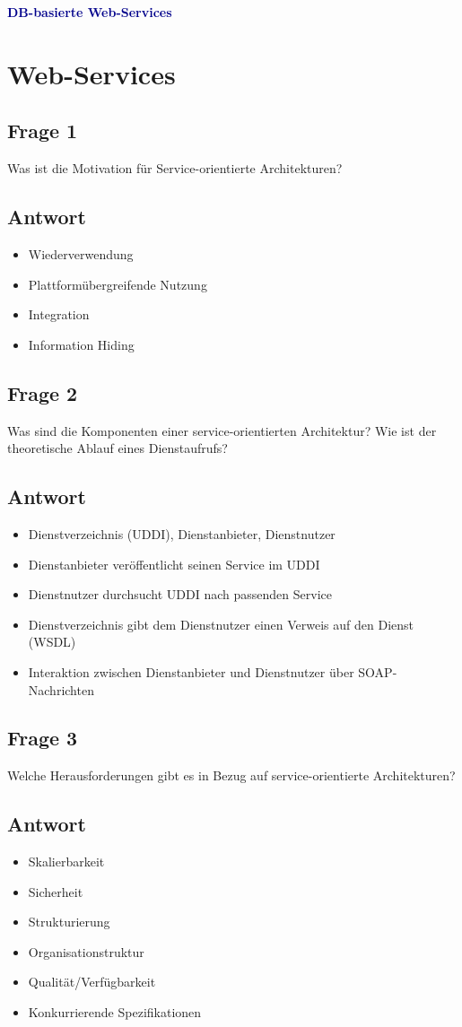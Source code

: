 \textbf{\textcolor{darkblue}{ DB-basierte Web-Services}}~

\section*{Web-Services}
\subsection*{Frage 1}
Was ist die Motivation für Service-orientierte Architekturen?
\subsection*{Antwort}
\begin{itemize}
	\item Wiederverwendung
	\item Plattformübergreifende Nutzung
    \item Integration
    \item Information Hiding
\end{itemize}

\subsection*{Frage 2}
Was sind die Komponenten einer service-orientierten Architektur? Wie ist der theoretische Ablauf eines Dienstaufrufs?
\subsection*{Antwort}
\begin{itemize}
	\item Dienstverzeichnis (UDDI), Dienstanbieter, Dienstnutzer
	\item Dienstanbieter veröffentlicht seinen Service im UDDI
	\item Dienstnutzer durchsucht UDDI nach passenden Service
	\item Dienstverzeichnis gibt dem Dienstnutzer einen Verweis auf den Dienst (WSDL)
	\item Interaktion zwischen Dienstanbieter und Dienstnutzer über SOAP-Nachrichten
\end{itemize}
\subsection*{Frage 3}
Welche Herausforderungen gibt es in Bezug auf service-orientierte Architekturen?
\subsection*{Antwort}
\begin{itemize}
	\item Skalierbarkeit
	\item Sicherheit
	\item Strukturierung
	\item Organisationstruktur
	\item Qualität/Verfügbarkeit
	\item Konkurrierende Spezifikationen
\end{itemize}
